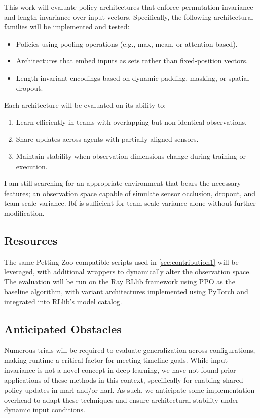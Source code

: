 This work will evaluate policy architectures that enforce permutation-invariance
and length-invariance over input vectors. Specifically, the following architectural 
families will be implemented and tested:
\begin{itemize}
    \item Policies using pooling operations (e.g., max, mean, or attention-based).
    \item Architectures that embed inputs as sets rather than fixed-position vectors.
    \item Length-invariant encodings based on dynamic padding, masking, or spatial dropout.
\end{itemize}
Each architecture will be evaluated on its ability to:
\begin{enumerate}
    \item Learn efficiently in teams with overlapping but non-identical observations.
    \item Share updates across agents with partially aligned sensors.
    \item Maintain stability when observation dimensions change during training or execution.
\end{enumerate}
I am still searching for an appropriate environment that bears the necessary features;
%
an observation space capable of simulate sensor 
occlusion, dropout, and team-scale variance.
\Gls{lbf} is sufficient for team-scale variance alone without further modification.

\subsection{Resources}

The same Petting Zoo-compatible scripts used in \cref{sec:contribution1} will be leveraged, 
with additional wrappers to dynamically alter the observation space. 
The evaluation will be run on the Ray RLlib framework using PPO as 
the baseline algorithm, with variant architectures implemented using 
PyTorch and integrated into RLlib's model catalog.

\subsection{Anticipated Obstacles}

Numerous trials will be required to evaluate generalization across configurations, 
making runtime a critical factor for meeting timeline goals.
While input invariance is not a novel concept in deep learning, 
we have not found prior applications of these methods in this context, 
specifically for enabling shared policy updates in \gls{marl} and/or \gls{harl}.
As such, we anticipate some implementation overhead to adapt these techniques 
and ensure architectural stability under dynamic input conditions.

